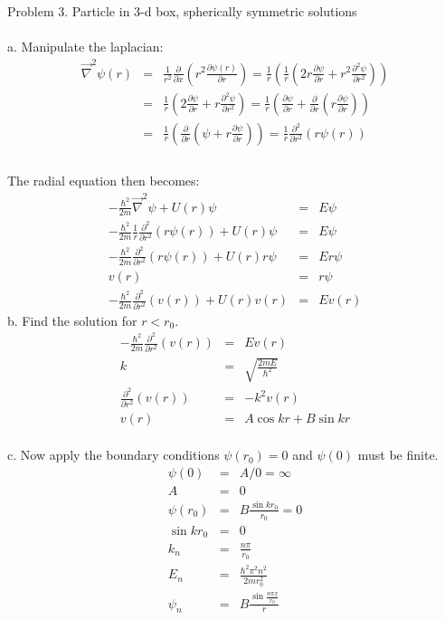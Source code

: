 \documentclass[11pt]{amsart}
\begin{document}
Problem 3. Particle in 3-d box, spherically symmetric solutions \\ \\
a. Manipulate the laplacian: \\
\begin{eqnarray*}
\vec{\nabla}^{2}\psi(r) &=& \frac{1}{r^{2}}\frac{\partial}{\partial{x}}(r^{2}\frac{\partial\psi(r)}{\partial{r}}) = \frac{1}{r}(\frac{1}{r}(2r\frac{\partial\psi}{\partial{r}}+r^{2}\frac{\partial^{2}\psi}{\partial{r}^{2}})) \\
&=& \frac{1}{r}(2\frac{\partial\psi}{\partial{r}}+r\frac{\partial^{2}\psi}{\partial{r}^{2}}) = \frac{1}{r}(\frac{\partial\psi}{\partial{r}}+\frac{\partial}{\partial{r}}(r\frac{\partial{\psi}}{\partial{r}})) \\
&=& \frac{1}{r}(\frac{\partial}{\partial{r}}(\psi+r\frac{\partial{\psi}}{\partial{r}})) = \frac{1}{r}\frac{\partial^{2}}{\partial{r}^{2}}(r\psi(r)) \\
\end{eqnarray*} \\
The radial equation then becomes: \\
\begin{eqnarray*} 
-\frac{\hbar^{2}}{2m}\vec{\nabla}^{2}\psi+U(r)\psi &=& E\psi \\
-\frac{\hbar^{2}}{2m}\frac{1}{r}\frac{\partial^{2}}{\partial{r}^{2}}(r\psi(r))+U(r)\psi &=& E\psi \\
-\frac{\hbar^{2}}{2m}\frac{\partial^{2}}{\partial{r}^{2}}(r\psi(r))+U(r)r\psi &=& Er\psi \\
v(r) &=& r\psi \\
-\frac{\hbar^{2}}{2m}\frac{\partial^{2}}{\partial{r}^{2}}(v(r))+U(r)v(r) &=& Ev(r) 
\end{eqnarray*} 
b. Find the solution for $r<r_{0}$. \\
\begin{eqnarray*} 
-\frac{\hbar^{2}}{2m}\frac{\partial^{2}}{\partial{r}^{2}}(v(r)) &=& Ev(r) \\
k &=& \sqrt{\frac{2mE}{\hbar^{2}}} \\
\frac{\partial^{2}}{\partial{r}^{2}}(v(r)) &=& -k^{2}v(r) \\
v(r) &=& A\cos{kr}+B\sin{kr} 
\end{eqnarray*} \\
c. Now apply the boundary conditions $\psi(r_{0})=0$ and $\psi(0)$ must be finite. \\
\begin{eqnarray*} 
\psi(0) &=& A/0 = \infty \\
A &=& 0 \\
\psi(r_{0}) &=& B\frac{\sin{kr_{0}}}{r_{0}} = 0 \\
\sin{kr_{0}} &=& 0 \\
k_{n} &=& \frac{n\pi}{r_{0}} \\
E_{n} &=& \frac{\hbar^{2}\pi^{2}n^{2}}{2mr_{0}^{2}} \\
\psi_{n} &=& B\frac{\sin{\frac{n\pi{x}}{r_{0}}}}{r} 
\end{eqnarray*} \\
\end{document}
